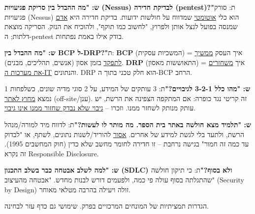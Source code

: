\documentclass[11pt]{article}
\newcommand{\enLR}[1]{\textenglish{#1}}
\newcommand{\sectionheading}[1]{\vskip10pt\penalty-200{\large\bfseries\color{h2}#1\par}\vskip3pt}
\begin{document}
\textbf{ש: "מה ההבדל בין סריקת פגיעויות \enLR{(Nessus)} לבדיקת חדירה \enLR{(pentest)}?"}\newline ת: סורק פגיעויות \enLR{(Nessus)} הוא כלי \underline{אוטומטי} שמדווח על חולשות ידועות. בדיקת חדירה היא \underline{אדם} שמנסה בפועל לנצל אותן ולפרוץ, "לחשוב כמו תוקף", ולהוכיח את הנזק. הסריקה מוצאת דלתות; ה-\enLR{pentest} בודק אילו באמת נפתחות.\par

\textbf{ש: "מה ההבדל בין \enLR{BCP} ל-\enLR{DRP}?"}\newline ת: \textbf{\enLR{BCP}} (המשכיות עסקית) = איך העסק \underline{ממשיך לתפקד} בזמן אסון (אנשים, תהליכים, מבנים). \textbf{\enLR{DRP}} (התאוששות מאסון) = איך \underline{משחזרים את מערכות ה-\enLR{IT}} והנתונים. \enLR{DRP} הוא חלק טכני בתוך ה-\enLR{BCP} הרחב.\par

\textbf{ש: "מהו כלל \enLR{3-2-1} לגיבויים?"}\newline ת: \enLR{3} עותקים של המידע, על \enLR{2} סוגי מדיה שונים, כשלפחות \enLR{1} נמצא \underline{מחוץ לאתר} \enLR{(off-site}/ענן). זה קריטי נגד כופרה: אם המתקפה הצפינה את הרשת, יש עותק מנותק לשחזר ממנו. וזכרו – \underline{גיבוי שלא נבדק שחזור ממנו אינו גיבוי}.\par

\textbf{ש: "תלמיד מצא חולשה באתר בית הספר. מה מותר לו לעשות?"}\newline ת: לדווח מיד למורה/מנהל הרשת, ולתעד בלי לגשת למידע של אחרים. \underline{אסור} להוריד/לשנות נתונים, לשתף, או "לבדוק עד כמה זה חמור" בגישה נרחבת – זו חדירה לחומר מחשב שלא כדין (חוק המחשבים \enLR{1995).} זה נקרא \enLR{Responsible Disclosure.}\par

\textbf{ש: "למה לשלב אבטחה כבר בשלב התכנון \enLR{(SDLC)} ולא בסוף?"}\newline ת: כי תיקון חולשה שהתגלתה בסוף עולה פי כמה, ולפעמים דורש לבנות מחדש. "אבטחה מהעיצוב" \enLR{(Security by Design)} זולה ויעילה בהרבה מטלאי מאוחר.\par

\sectionheading{מילון מונחים – הגדרות}

הגדרות תמציתיות של המונחים המרכזיים בפרק. שימושי גם כדף עזר לבחינה.\par
\end{document}
